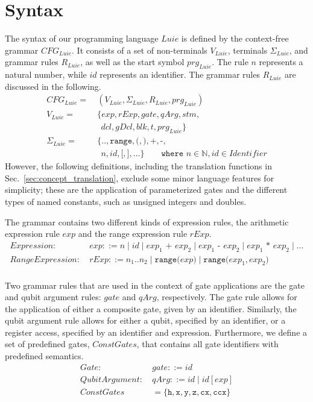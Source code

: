 \section{Syntax}
\label{sec:concept_abstractGrammar}
The syntax of our programming language $Luie$ is defined by the context-free grammar $CFG_{Luie}$. It consists of a set of non-terminals $V_{Luie}$, terminals $\Sigma_{Luie}$, and grammar rules $R_{Luie}$, as well as the start symbol $prg_{Luie}$. The rule $n$ represents a natural number, while $id$ represents an identifier. The grammar rules $R_{Luie}$ are discussed in the following. 
\begin{align*}
    CFG_{Luie} = \ & (V_{Luie}, \Sigma_{Luie}, R_{Luie}, prg_{Luie} )\\ 
    V_{Luie} = \ & \{ exp, rExp, gate,  qArg, stm,\\ 
    & \ \  dcl, gDcl, blk, t, prg_{Luie} \}\\ 
    \Sigma_{Luie} = \ & \{\texttt{..}, \texttt{range}, \texttt{(}, \texttt{)}, \texttt{+}, \texttt{-}, \\
    & \ \  n, id, \texttt{[}, \texttt{]}, \dots \} 
    \quad \quad \texttt{where } n \in \mathbb{N}, id \in Identifier
\end{align*}
However, the following definitions, including the translation functions in Sec.~\ref{sec:concept_translation}, exclude some minor language features for simplicity; these are the application of parameterized gates and the different types of named constants, such as unsigned integers and doubles.

The grammar contains two different kinds of expression rules, the arithmetic expression rule $exp$ and the range expression rule $rExp$.
\begin{align*}
    Expression: \ & exp ::= n \mid id \mid exp_1 \texttt{ + } exp_2 \mid exp_1 \texttt{ - } exp_2 \mid exp_1 \texttt{ * } exp_2 \mid \dots\\
    RangeExpression: \ & rExp ::= n_1 .. n_2 \mid \texttt{range(} exp \texttt{)} \mid \texttt{range(} exp_1, exp_2 \texttt{)}\\
\end{align*}

Two grammar rules that are used in the context of gate applications are the gate and qubit argument rules: $gate$ and $qArg$, respectively. The gate rule allows for the application of either a composite gate, given by an identifier. Similarly, the qubit argument rule allows for either a qubit, specified by an identifier, or a register access, specified by an identifier and expression. Furthermore, we define a set of predefined gates, $ConstGates$, that contains all gate identifiers with predefined semantics.
\begin{align*}
    Gate: \ & gate ::= id\\
    QubitArgument: \ & qArg ::= id \mid id[exp]\\
    ConstGates &= \{\texttt{h}, \texttt{x}, \texttt{y}, \texttt{z}, \texttt{cx}, \texttt{ccx}\}
\end{align*}

